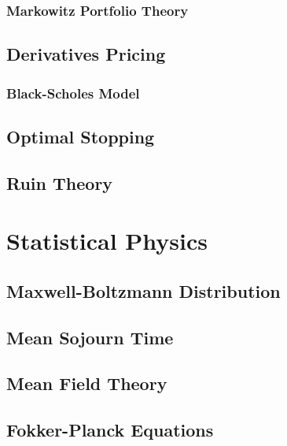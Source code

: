 \documentclass[11pt]{report} %
\begin{document}
\subsection{Markowitz Portfolio Theory}

\section{Derivatives Pricing}

\subsection{Black-Scholes Model}

\section{Optimal Stopping}

\section{Ruin Theory}

\chapter{Statistical Physics}

\section{Maxwell-Boltzmann Distribution}

\section{Mean Sojourn Time}

\section{Mean Field Theory}

\section{Fokker-Planck Equations}

{}

\end{document}

